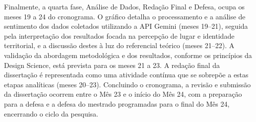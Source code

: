 Finalmente, a quarta fase, Análise de Dados, Redação Final e Defesa, ocupa os meses 19 a
24 do cronograma. O gráfico detalha o processamento e a análise de sentimento dos dados
coletados utilizando a API Gemini (meses 19--21), seguida pela interpretação dos resultados
focada na percepção de lugar e identidade territorial, e a discussão destes à luz do referencial
teórico (meses 21--22). A validação da abordagem metodológica e dos resultados, conforme os
princípios da Design Science, está prevista para os meses 21 a 23. A redação final da dissertação é
representada como uma atividade contínua que se sobrepõe a estas etapas analíticas (meses
20--23). Concluindo o cronograma, a revisão e submissão da dissertação ocorrem entre o Mês 23 e
o início do Mês 24, com a preparação para a defesa e a defesa do mestrado programadas para o
final do Mês 24, encerrando o ciclo da pesquisa.
